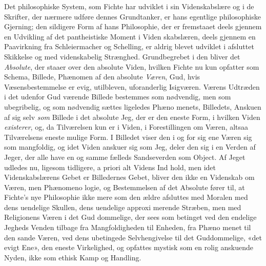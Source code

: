 \documentclass[12pt,a4paper]{book}
\begin{document}
Det philosophiske System, som Fichte har udviklet i sin
Videnskabslære og i de Skrifter, der nærmere udføre dennes
Grundtanker, er hans egentlige philosophiske Gjerning; den
sildigere Form af hans Philosophie, der er fremstaaet deels
gjennem en Udvikling af det pantheistiske Moment i Viden\-%
skabslæren, deels gjennem en Paavirkning fra Schleiermacher
og Schelling, er aldrig blevet udviklet i afsluttet Skikkelse og
med videnskabelig Strænghed. Grundbegrebet i den bliver
det \emph{Absolute}, der staaer over den absolute Viden, hvilken
Fichte nu kun opfatter som Schema, Billede, Phænomen af
den absolute \emph{Væren}, Gud, hvis Væsensbestemmelse er evig,
utilbleven, uforanderlig Isigværen. Værens Udtræden i det
udenfor Gud værende Billede bestemmes som nødvendig, men
som ubegribelig, og som nødvendig sættes ligeledes Phæno\-%
menets, Billedets, Anskuen af sig selv \emph{som} Billede i det
absolute Jeg, der er den eneste Form, i hvilken Viden \emph{existerer},
og, da Tilværelsen kun er i Viden, i Forestillingen om Væren,
altsaa Tilværelsens eneste mulige Form. I Billedet viser den
i og for sig ene Væren sig som mangfoldig, og idet Viden
anskuer sig som Jeg, deler den sig i en Verden af Jeger, der
alle have en og samme fælleds Sandseverden som Object. Af
Jeget udledes nu, ligesom tidligere, a priori alt Videns Ind\-%
hold, men idet Videnskabslærens Gebet er Billedernes Gebet,
bliver den ikke en Videnskab om Væren, men Phænomeno\-%
logie, og Bestemmelsen af det Absolute fører til, at Fichte's
nye Philosophie ikke mere som den ældre afsluttes med
Moralen med dens uendelige Skullen, dens uendelige approxi\-%
merende Stræben, men med Religionens Væren i det Gud\-%
dommelige, der sees som betinget ved den endelige Jegheds
Venden tilbage fra Mangfoldigheden til Enheden, fra Phæno\-%
menet til den sande Væren, ved dens ubetingede Selvhengivelse
til det Guddommelige, «det evigt Ene», den eneste Virkelighed,
og opfattes mystisk som en rolig anskuende Nyden, ikke som
ethisk Kamp og Handling.
\end{document}
